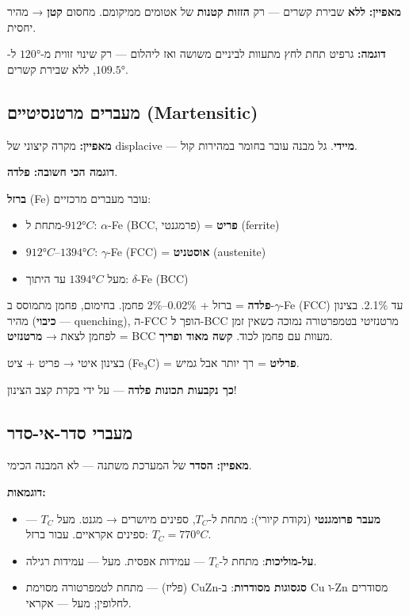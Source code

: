 \documentclass[
  hebrew,
  letterpaper,
  DIV=11,
  numbers=noendperiod]{scrreprt}
\providecommand{\tightlist}{%
  \setlength{\itemsep}{0pt}\setlength{\parskip}{0pt}}
\begin{document}
\textbf{מאפיין:} \textbf{ללא} שבירת קשרים --- רק \textbf{הזזות קטנות} של
אטומים ממיקומם. מחסום \textbf{קטן} → מהיר יחסית.

\textbf{דוגמה:} גרפיט תחת לחץ מתעוות לביניים משושה ואז ליהלום --- רק
שינוי זווית מ-\(120°\) ל-\(109.5°\), ללא שבירת קשרים.

\subsection{מעברים מרטנסיטיים
(Martensitic)}\label{ux5deux5e2ux5d1ux5e8ux5d9ux5dd-ux5deux5e8ux5d8ux5e0ux5e1ux5d9ux5d8ux5d9ux5d9ux5dd-martensitic}

\textbf{מאפיין:} מקרה קיצוני של displacive --- \textbf{מיידי}. גל מבנה
עובר בחומר במהירות קול.

\textbf{דוגמה הכי חשובה:} \textbf{פלדה}.

\textbf{ברזל} (Fe) עובר מעברים מרכזיים:

\begin{itemize}
\tightlist
\item
  מתחת ל-\(912°C\): \(\alpha\)-Fe (BCC, פרמגנטי) = \textbf{פריט}
  (ferrite)
\item
  \(912°C\)--\(1394°C\): \(\gamma\)-Fe (FCC) = \textbf{אוסטניט}
  (austenite)
\item
  מעל \(1394°C\) עד היתוך: \(\delta\)-Fe (BCC)
\end{itemize}

\textbf{פלדה} = ברזל + 0.02\%--2\% פחמן. בחימום, פחמן מתמוסס
ב-\(\gamma\)-Fe (FCC) עד 2.1\%. בצינון מהיר (\textbf{כיבוי} ---
quenching), ה-FCC הופך ל-BCC מרטנזיטי בטמפרטורה נמוכה כשאין זמן לפחמן
לצאת → \textbf{מרטנזיט} = BCC מעוות עם פחמן לכוד. \textbf{קשה מאוד
ופריך}.

בצינון איטי → פריט + ציט (Fe₃C) = \textbf{פרליט} = רך יותר אבל גמיש.

\textbf{כך נקבעות תכונות פלדה} --- על ידי בקרת קצב הצינון!

\subsection{מעברי
סדר-אי-סדר}\label{ux5deux5e2ux5d1ux5e8ux5d9-ux5e1ux5d3ux5e8-ux5d0ux5d9-ux5e1ux5d3ux5e8}

\textbf{מאפיין:} \textbf{הסדר} של המערכת משתנה --- לא המבנה הכימי.

\textbf{דוגמאות:}

\begin{itemize}
\tightlist
\item
  \textbf{מעבר פרומגנטי} (נקודת קיורי): מתחת ל-\(T_C\), ספינים מיושרים →
  מגנט. מעל \(T_C\) --- ספינים אקראיים. עבור ברזל: \(T_C = 770°C\).
\item
  \textbf{על-מוליכות}: מתחת ל-\(T_c\) --- עמידות אפסית. מעל --- עמידות
  רגילה.
\item
  \textbf{סגסוגות מסודרות}: ב-\(\text{CuZn}\) (פליז) --- מתחת לטמפרטורה
  מסוימת Cu ו-Zn מסודרים לחלופין; מעל --- אקראי.
\end{itemize}
\end{document}
